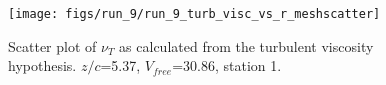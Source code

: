 \begin{figure}[H]
\centering
\texttt{[image: figs/run\_9/run\_9\_turb\_visc\_vs\_r\_meshscatter]}
\caption{Scatter plot of $\nu_T$ as calculated from the turbulent viscosity hypothesis. $z/c$=5.37, $V_{free}$=30.86, station 1.}
\label{fig:run_9_turb_visc_vs_r_meshscatter}
\end{figure}


